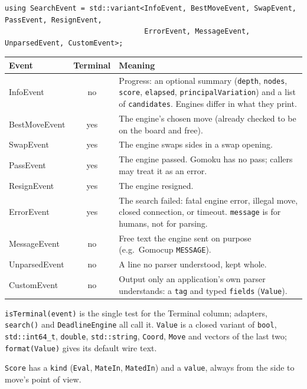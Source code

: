 \documentclass[11pt,a4paper]{article}
\newcommand{\code}[1]{\texttt{#1}}
\begin{document}
\begin{lstlisting}
using SearchEvent = std::variant<InfoEvent, BestMoveEvent, SwapEvent, PassEvent, ResignEvent,
                                 ErrorEvent, MessageEvent, UnparsedEvent, CustomEvent>;
\end{lstlisting}

\begin{center}
\small
\begin{tabularx}{\textwidth}{@{}>{\ttfamily}l c X@{}}
\toprule
\normalfont\textbf{Event} & \textbf{Terminal} & \textbf{Meaning} \\
\midrule
InfoEvent     & no  & Progress: an optional summary (\code{depth}, \code{nodes}, \code{score},
                      \code{elapsed}, \code{principalVariation}) and a list of \code{candidates}.
                      Engines differ in what they print. \\
BestMoveEvent & yes & The engine's chosen move (already checked to be on the board and free). \\
SwapEvent     & yes & The engine swaps sides in a swap opening. \\
PassEvent     & yes & The engine passed. Gomoku has no pass; callers may treat it as an error. \\
ResignEvent   & yes & The engine resigned. \\
ErrorEvent    & yes & The search failed: fatal engine error, illegal move, closed connection, or
                      timeout. \code{message} is for humans, not for parsing. \\
MessageEvent  & no  & Free text the engine sent on purpose (e.g.\ Gomocup \code{MESSAGE}). \\
UnparsedEvent & no  & A line no parser understood, kept whole. \\
CustomEvent   & no  & Output only an application's own parser understands: a \code{tag} and
                      typed \code{fields} (\code{Value}). \\
\bottomrule
\end{tabularx}
\end{center}

\noindent \code{isTerminal(event)} is the single test for the Terminal column; adapters,
\code{search()} and \code{DeadlineEngine} all call it. \code{Value} is a closed variant of
\code{bool}, \code{std::int64\_t}, \code{double}, \code{std::string}, \code{Coord}, \code{Move}
and vectors of the last two; \code{format(Value)} gives its default wire text.

\noindent \code{Score} has a \code{kind} (\code{Eval}, \code{MateIn}, \code{MatedIn}) and a
\code{value}, always from the side to move's point of view.
\end{document}
